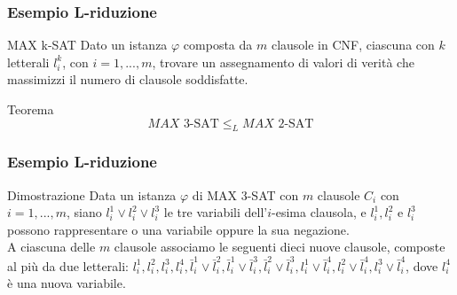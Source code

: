 \documentclass{beamer}
\begin{document}
\begin{frame}
    \frametitle{Esempio L-riduzione}
    
    \begin{block}{MAX k-SAT}
        Dato un istanza $\varphi$ composta da $m$ clausole in CNF, ciascuna con $k$ letterali $l^{k}_i$, con $i=1,...,m$, trovare un assegnamento di valori di verità che massimizzi il numero di clausole soddisfatte.

    \end{block}
    \vskip 40pt
    \begin{block}{Teorema}
        $$MAX \text{ 3-SAT} \le_L MAX \text{ 2-SAT}$$
    \end{block}

    


\end{frame}

\begin{frame}
    \frametitle{Esempio L-riduzione}
    \begin{block}{Dimostrazione}
        Data un istanza $\varphi$ di MAX 3-SAT con $m$ clausole $C_i$ con $i = 1,...,m$, siano $l_i^1 \vee l_i^2 \vee l_i^3$ le tre variabili dell'$i$-esima clausola, e $l_i^1, l_i^2 $ e $ l_i^3$ possono rappresentare o una variabile oppure la sua negazione.\\
        A ciascuna delle $m$ clausole associamo le seguenti dieci nuove clausole, composte al più da due letterali: $l_i^1, l_i^2, l_i^3, l_i^4, \bar l_i^1 \vee \bar l_i^2, \bar l_i^1 \vee \bar l_i^3, \bar l_i^2 \vee \bar l_i^3, l_i^1 \vee \bar l_i^4, l_i^2 \vee \bar l_i^4, l_i^3 \vee \bar l_i^4$, dove $l_i^4$ è una nuova variabile.
    \end{block}

\end{frame}
\end{document}
